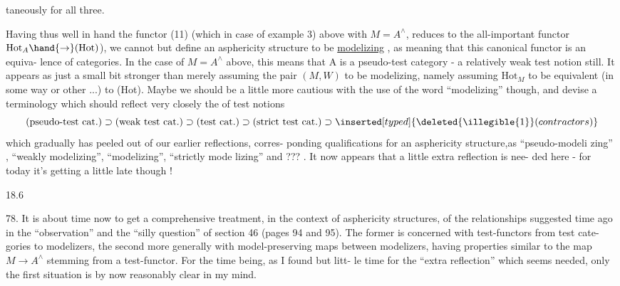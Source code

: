 taneously for all three.

Having thus well in hand the  functor (11) (which in
case of example  3) above with $M=A^{\wedge}$, reduces to the all-important
functor $\mathrm{Hot}_{A}\hand{\to}(\mathrm{Hot})$),  we cannot but define an asphericity structure
to be \uline{modelizing} , as meaning that this canonical functor is an equiva-%
lence of categories. In the case of $M= A^{\wedge}$ above, this means that A
is a pseudo-test category - a relatively weak test notion still. It
appears as just a  small bit stronger than merely assuming the pair
$(M,W)$ to be modelizing,  namely assuming $\mathrm{Hot}_{M}$ to be equivalent (in some
way or other ...) to (Hot). Maybe we should be a little more cautious
with the use of the word ``modelizing'' though, and devise a terminology
which should reflect very closely the  of 
test notions
\[
\text{(pseudo-test cat.)}\supset\text{(weak test cat.)}\supset\text{(test cat.)}\supset\text{(strict test cat.)}\supset \inserted[typed]{\deleted{\illegible{1}} (contractors)}
\]
which gradually has peeled out of our earlier reflections,   corres-%
ponding qualifications for an asphericity structure,as  ``pseudo-modeli%
zing'' ,  ``weakly modelizing'', ``modelizing'', ``strictly mode%
lizing''\hand{,} and ??? . It now appears that a little extra reflection is nee-%
ded here - for today it's getting a little late though !

18.6

78. It is about time now to get a comprehensive treatment, in the
context of asphericity structures, of the relationships suggested time
ago in the ``observation'' and the ``silly question'' of section 46 (pages
94 and 95). The former is concerned with test-functors from test cate-%
gories to modelizers, the second more generally with model-preserving
maps between modelizers, having properties similar to the map $M\to A^{\wedge}$
stemming from a test-functor. For the time being, as I found but litt-%
le time for the ``extra reflection'' which seems needed, only the first
situation is by now reasonably clear in my mind.

